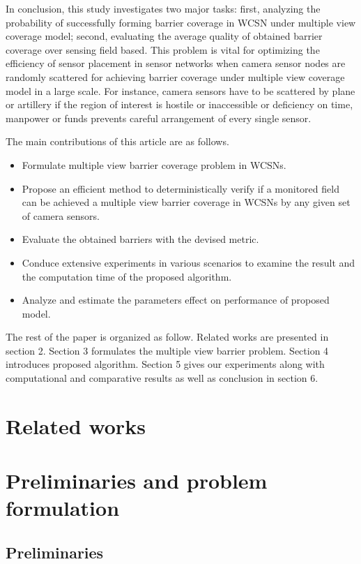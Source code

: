\documentclass[3p]{elsarticle}
\begin{document}
In conclusion, this study investigates two major tasks: first, analyzing the probability of successfully forming barrier coverage in WCSN under multiple view coverage model; second, evaluating the average quality of obtained barrier coverage over sensing field based. This problem is vital for optimizing the efficiency of sensor placement in sensor networks when camera sensor nodes are randomly scattered for achieving barrier coverage under multiple view coverage model in a large scale. For instance, camera sensors have to be scattered by plane or artillery if the region of interest is hostile or inaccessible or deficiency on time, manpower or funds prevents careful arrangement of every single sensor.\par
%
The main contributions of this article are as follows. 
\begin{itemize}
	\item Formulate multiple view barrier coverage problem in WCSNs.
	\item Propose an efficient method to deterministically verify if a monitored field can be achieved a multiple view barrier coverage in WCSNs by any given set of camera sensors. 
	\item Evaluate the obtained barriers with the devised metric.
	\item Conduce extensive experiments in various scenarios to examine the result and the computation time of the proposed algorithm.
	\item Analyze and estimate the parameters effect on performance of proposed model.
\end{itemize}
%
The rest of the paper is organized as follow. Related works are presented in section 2. Section 3 formulates the multiple view barrier problem. Section 4 introduces proposed algorithm. Section 5 gives our experiments along with computational and comparative results as well as conclusion in section 6.
%

\section{Related works}


\section{Preliminaries and problem formulation}
\subsection{Preliminaries}


\end{document}
